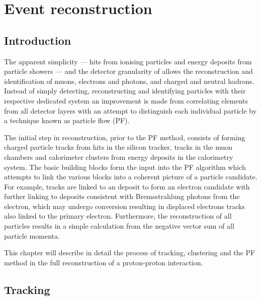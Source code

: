 \chapter{Event reconstruction}\label{chap:reconstruction}


\section{Introduction}

The apparent simplicity --- hits from ionising particles and energy deposits
from particle showers --- and the detector granularity of \CMS allows the
reconstruction and identification of muons, electrons and photons, and charged
and neutral hadrons. Instead of simply detecting, reconstructing and
identifying particles with their respective dedicated system an improvement is
made from correlating elements from all detector layers with an attempt to
distinguish each individual particle by a technique known as particle flow (PF).

The initial step in reconstruction, prior to the PF method, consists of
forming charged particle tracks from hits in the silicon tracker, tracks in
the muon chambers and calorimeter clusters from energy deposits in the
calorimetry system. The basic building blocks form the input into the PF
algorithm which attempts to link the various blocks into a coherent picture of
a particle candidate. For example, tracks are linked to an \ECAL deposit to
form an electron candidate with further linking to \ECAL deposits consistent
with Bremsstrahlung photons from the electron, which may undergo conversion
resulting in displaced electrons tracks also linked to the primary electron.
Furthermore, the reconstruction of all particles results in a simple \ptmiss
calculation from the negative vector sum of all particle momenta.

This chapter will describe in detail the process of tracking, clustering and
the PF method in the full reconstruction of a proton-proton interaction.


\section{Tracking}

